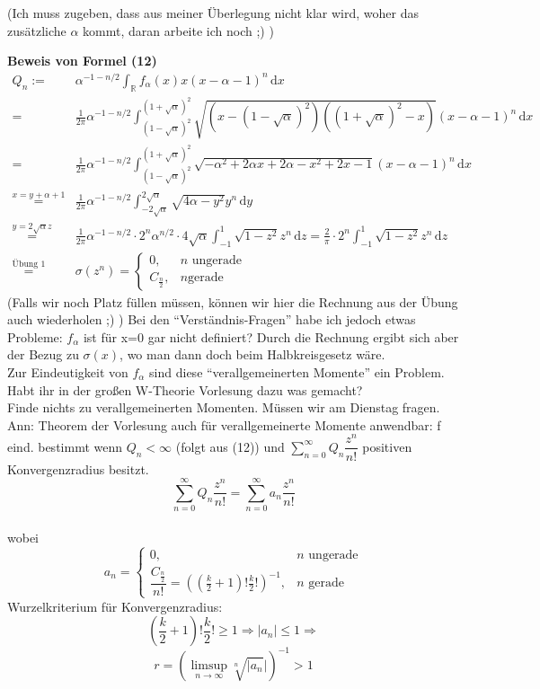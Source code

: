 \documentclass[a4paper, 11pt]{scrreprt}
\newcommand{\RR}{\mathbb{R}}
\begin{document}
(Ich muss zugeben, dass aus meiner Überlegung nicht klar wird, woher das zusätzliche \(\alpha\) kommt, daran arbeite ich noch ;) )

\textbf{Beweis von Formel (12)}\\
\begin{align*}
	Q_n :=& \alpha^{-1-n/2}\int_{\RR} f_{\alpha}(x)x(x-\alpha -1)^n\,\mathrm{d}x \\
	 =& \frac{1}{2\pi}\alpha^{-1-n/2} \int_{(1-\sqrt{\alpha})^2}^{(1+\sqrt{\alpha})^2} \sqrt{(x-(1-\sqrt{\alpha})^2)((1+\sqrt{\alpha})^2-x)} (x-\alpha -1)^n \,\mathrm{d}x\\
	=& \frac{1}{2\pi}\alpha^{-1-n/2} \int_{(1-\sqrt{\alpha})^2}^{(1+\sqrt{\alpha})^2} \sqrt{-\alpha^2+2\alpha x+2\alpha -x^2+2x-1}(x-\alpha-1)^n \,\mathrm{d}x\\
	\overset{x=y+\alpha+1}{=}& \frac{1}{2\pi}\alpha^{-1-n/2} \int_{-2\sqrt{\alpha}}^{2\sqrt{\alpha}} \sqrt{4\alpha -y^2} y^n \,\mathrm{d}y\\
	\overset{y=2\sqrt{\alpha}z}{=}& \frac{1}{2\pi}\alpha^{-1-n/2} \cdot 2^n \alpha^{n/2}\cdot4\sqrt{\alpha}\int_{-1}^{1} \sqrt{1-z^2}z^n \,\mathrm{d}z = \frac{2}{\pi} \cdot 2^n\int_{-1}^{1} \sqrt{1-z^2}z^n\,\mathrm{d}z \\
	\overset{\text{Übung 1}}{=}& \sigma(z^n) = \begin{cases} 0, &n\text{ ungerade}\\
	C_{\frac n 2}, &n\text{gerade} \end{cases}
\end{align*}
(Falls wir noch Platz füllen müssen, können wir hier die Rechnung aus der Übung auch wiederholen ;) )
Bei den "`Verständnis-Fragen"' habe ich jedoch etwas Probleme: \(f_{\alpha}\) ist für x=0 gar nicht definiert? Durch die Rechnung ergibt sich aber der Bezug zu \(\sigma(x)\), wo man dann doch beim Halbkreisgesetz wäre.\\
Zur Eindeutigkeit von \(f_{\alpha}\) sind diese "`verallgemeinerten Momente"' ein Problem. Habt ihr in der großen W-Theorie Vorlesung dazu was gemacht?\\

Finde nichts zu verallgemeinerten Momenten. Müssen wir am Dienstag fragen.\\
Ann: Theorem der Vorlesung auch für verallgemeinerte Momente anwendbar: f eind. bestimmt wenn $ Q_n< \infty $ (folgt aus (12)) und $ \sum_{n=0}^{\infty} Q_n \dfrac{z^n}{n!}$ positiven Konvergenzradius besitzt.\\
\[ \sum_{n=0}^{\infty} Q_n \dfrac{z^n}{n!}= \sum_{n=0}^{\infty} a_n \dfrac{z^n}{n!}\]\\
wobei \[ a_n=\begin{cases} 0, &n\text{ ungerade}\\
	\dfrac{C_{\frac n 2}}{n!}=((\frac{k}{2}+1)!\frac{k}{2}!)^{-1}, &n\text{ gerade} \end{cases} \]
	Wurzelkriterium für Konvergenzradius: 
	\[(\frac{k}{2}+1)!\frac{k}{2}! \geq 1 \Rightarrow \vert a_n \vert \leq 1 \Rightarrow \]
	\[ r=(\limsup_{n \to \infty} \sqrt[n]{\vert a_n} \vert )^{-1} >1 \]
	
\end{document}

